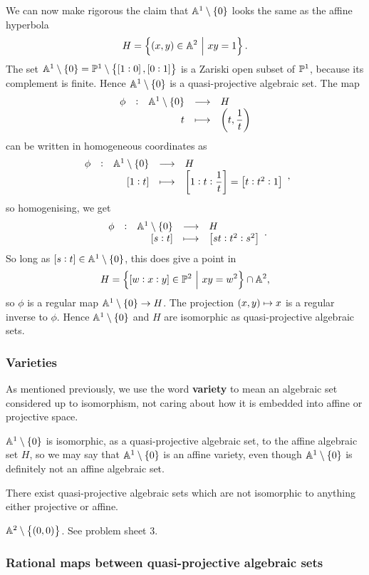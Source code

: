 \begin{example*}
We can now make rigorous the claim that $ \AA^1 \setminus \cbr{0} $ looks the same as the affine hyperbola
$$ H = \cbr{\br{x, y} \in \AA^2 \st xy = 1}. $$
The set $ \AA^1 \setminus \cbr{0} = \PP^1 \setminus \cbr{\sbr{1 : 0}, \sbr{0 : 1}} $ is a Zariski open subset of $ \mathbb{P}^1 $, because its complement is finite. Hence $ \AA^1 \setminus \cbr{0} $ is a quasi-projective algebraic set. The map
$$ \function[\phi]{\AA^1 \setminus \cbr{0}}{H}{t}{\br{t, \dfrac{1}{t}}} $$
can be written in homogeneous coordinates as
$$ \function[\phi]{\AA^1 \setminus \cbr{0}}{H}{\sbr{1 : t}}{\sbr{1 : t : \dfrac{1}{t}} = \sbr{t : t^2 : 1}}, $$
so homogenising, we get
$$ \function[\phi]{\AA^1 \setminus \cbr{0}}{H}{\sbr{s : t}}{\sbr{st : t^2 : s^2}}. $$
So long as $ \sbr{s : t} \in \AA^1 \setminus \cbr{0} $, this does give a point in
$$ H = \cbr{\sbr{w : x : y} \in \PP^2 \st xy = w^2} \cap \AA^2, $$
so $ \phi $ is a regular map $ \AA^1 \setminus \cbr{0} \to H $. The projection $ \br{x, y} \mapsto x $ is a regular inverse to $ \phi $. Hence $ \AA^1 \setminus \cbr{0} $ and $ H $ are isomorphic as quasi-projective algebraic sets.
\end{example*}

\subsubsection{Varieties}

As mentioned previously, we use the word \textbf{variety} to mean an algebraic set considered up to isomorphism, not caring about how it is embedded into affine or projective space.

\begin{example*}
$ \AA^1 \setminus \cbr{0} $ is isomorphic, as a quasi-projective algebraic set, to the affine algebraic set $ H $, so we may say that $ \AA^1 \setminus \cbr{0} $ is an affine variety, even though $ \AA^1 \setminus \cbr{0} $ is definitely not an affine algebraic set.
\end{example*}

There exist quasi-projective algebraic sets which are not isomorphic to anything either projective or affine.

\begin{example*}
$ \AA^2 \setminus \cbr{\br{0, 0}} $. See problem sheet $ 3 $.
\end{example*}

\subsubsection{Rational maps between quasi-projective algebraic sets}

